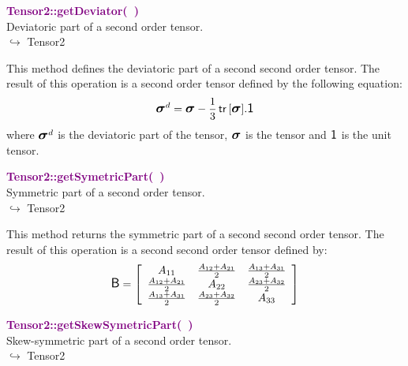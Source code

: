 \textcolor{purple}{\textbf{Tensor2::getDeviator(~)}}\label{Tensor2::getDeviator()}\\
Deviatoric part of a second order tensor.\\ \hspace*{10mm}$\hookrightarrow$ Tensor2

This method defines the deviatoric part of a second second order tensor.
The result of this operation is a second order tensor defined by the following equation:
\begin{equation*}
\mbox{\large\ensuremath{\boldsymbol{\sigma}}}^d=\mbox{\large\ensuremath{\boldsymbol{\sigma}}}-\frac{1}{3}\mbox{\ensuremath{\mathsf{\,tr\,}}}[\mbox{\large\ensuremath{\boldsymbol{\sigma}}}].\mbox{\large\ensuremath{\mathsf{1}}}
\end{equation*}
where $\mbox{\large\ensuremath{\boldsymbol{\sigma}}}^d$ is the deviatoric part of the tensor, $\mbox{\large\ensuremath{\boldsymbol{\sigma}}}$ is the tensor and $\mbox{\large\ensuremath{\mathsf{1}}}$ is the unit tensor.

\textcolor{purple}{\textbf{Tensor2::getSymetricPart(~)}}\label{Tensor2::getSymetricPart()}\\
Symmetric part of a second order tensor.\\ \hspace*{10mm}$\hookrightarrow$ Tensor2

This method returns the symmetric part of a second second order tensor.
The result of this operation is a second second order tensor defined by:
\begin{equation*}
\mbox{\large\ensuremath{\mathsf{B}}} = \left[\begin{array}{ccc}
 A_{11} & \frac{A_{12} + A_{21}}{2} & \frac{A_{13} + A_{31}}{2}\\
 \frac{A_{12} + A_{21}}{2} & A_{22} & \frac {A_{23} + A_{32}}{2}\\
 \frac{A_{13} + A_{31}}{2} & \frac {A_{23} + A_{32}}{2} & A_{33}\end{array}
\right]
\end{equation*}

\textcolor{purple}{\textbf{Tensor2::getSkewSymetricPart(~)}}\label{Tensor2::getSkewSymetricPart()}\\
Skew-symmetric part of a second order tensor.\\ \hspace*{10mm}$\hookrightarrow$ Tensor2

